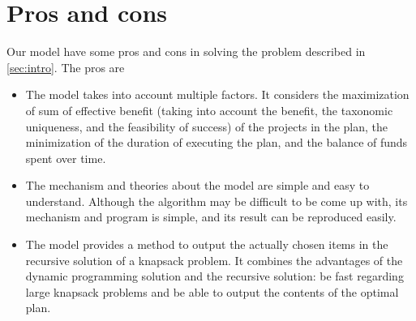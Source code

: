 \documentclass{article}
\begin{document}

\section{Pros and cons}
Our model have some pros and cons in solving the problem described in \ref{sec:intro}.
The pros are
\begin{itemize}
\item The model takes into account multiple factors.
It considers the maximization of sum of effective benefit
(taking into account the benefit, the taxonomic uniqueness, and the feasibility of success)
of the projects in the plan,
the minimization of the duration of executing the plan,
and the balance of funds spent over time.
\item The mechanism and theories about the model are simple and easy to understand.
Although the algorithm may be difficult to be come up with,
its mechanism and program is simple, and its result can be reproduced easily.
\item The model provides a method to output the actually chosen items in the recursive solution of a knapsack problem.
It combines the advantages of the dynamic programming solution and the recursive solution: be fast regarding large knapsack problems and be able to output the contents of the optimal plan.
\end{itemize}
\end{document}
